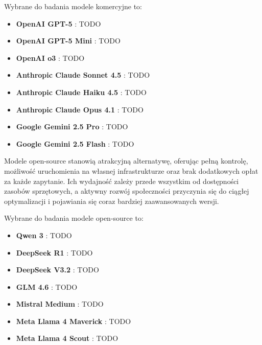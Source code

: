 Wybrane do badania modele komercyjne to:

\begin{itemize}
    \item \textbf{OpenAI GPT-5} \cite{gpt5}: TODO

    \item \textbf{OpenAI GPT-5 Mini} \cite{gpt5mini}: TODO

    \item \textbf{OpenAI o3} \cite{o3}: TODO

    \item \textbf{Anthropic Claude Sonnet 4.5} \cite{claude_sonnet45}: TODO

    \item \textbf{Anthropic Claude Haiku 4.5} \cite{claude_haiku45}: TODO

    \item \textbf{Anthropic Claude Opus 4.1} \cite{claude_opus41}: TODO

    \item \textbf{Google Gemini 2.5 Pro} \cite{gemini25_pro}: TODO

    \item \textbf{Google Gemini 2.5 Flash} \cite{gemini25_flash}: TODO
\end{itemize}

Modele open-source stanowią atrakcyjną alternatywę, oferując pełną kontrolę, możliwość uruchomienia na własnej infrastrukturze oraz brak dodatkowych opłat za każde zapytanie. Ich wydajność zależy przede wszystkim od dostępności zasobów sprzętowych, a aktywny rozwój społeczności przyczynia się do ciągłej optymalizacji i pojawiania się coraz bardziej zaawansowanych wersji.

Wybrane do badania modele open-source to:

\begin{itemize}
    \item \textbf{Qwen 3} \cite{qwen3}: TODO

    \item \textbf{DeepSeek R1} \cite{deepseek_r1}: TODO

    \item \textbf{DeepSeek V3.2} \cite{deepseek_v32}: TODO

    \item \textbf{GLM 4.6} \cite{glm46}: TODO

    \item \textbf{Mistral Medium} \cite{mistral_medium}: TODO

    \item \textbf{Meta Llama 4 Maverick} \cite{llama4_maverick}: TODO

    \item \textbf{Meta Llama 4 Scout} \cite{llama4_scout}: TODO
\end{itemize}

